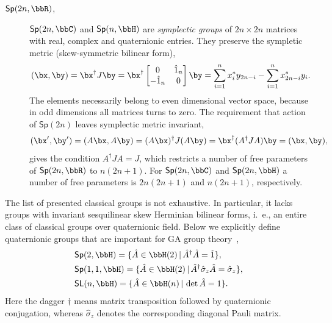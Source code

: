 \begin{unit}
\begin{description}
\item[$\mathsf{Sp}(2n,\bbR)$,] $\mathsf{Sp}(2n,\bbC)$ and
$\mathsf{Sp}(n,\bbH)$ are \textit{symplectic groups} of $2n\times
2n$ matrices with real, complex and quaternionic entries. They
preserve the  sympletic metric (skew-symmetric bilinear form),
\[
(\bx,\by)= \bx^{\dagger}J \by= \bx^{\dagger}
\begin{bmatrix}0&\hat{1}_n\\-\hat{1}_n&0\end{bmatrix}\by=\sum_{i=1}^n
x_i^* y_{2n-i} -\sum_{i=1}^{n} x_{2n-i}^* y_i.
\]
The elements necessarily belong to even dimensional vector space, because in odd dimensions all matrices turns to zero.
The requirement that action of $\mathsf{Sp}(2n)$ leaves symplectic
metric invariant,
\[(\bx^\prime,\by^\prime)=(A\bx,A\by)=(A\bx)^{\dagger}J(A\by)=
\bx^{\dagger}(A^{\dagger}J A)\by=(\bx,\by),\] gives the condition
$A^{\dagger}J A = J$, which restricts a number of free parameters
of $\mathsf{Sp}(2n,\bbR)$ to $n(2n+1)$. For $\mathsf{Sp}(2n,\bbC)$
and $\mathsf{Sp}(2n,\bbH)$ a number of  free parameters is
$2n(2n+1)$ and $n(2n+1)$, respectively.
\end{description}
The list of presented classical groups is not exhaustive. In
particular,  it lacks groups with invariant sesquilinear skew
Herminian bilinear forms, i.~e., an entire class of classical
groups over quaternionic field. Below we explicitly define
quaternionic groups that are important for GA group
theory~\cite{Trautman06},
\[\begin{split}
 &\mathsf{Sp}(2,\bbH)=\{\hat{A}\in\bbH(2)\,|\,\hat{A}^{\dagger}\hat{A}=\hat{1}\},\\
 &\mathsf{Sp}(1,1,\bbH)=\{\hat{A}\in\bbH(2)\,|\,\hat{A}^{\dagger}\hat{\sigma}_z\hat{A}=\hat{\sigma}_z\},\\
 &\mathsf{SL}(n,\bbH)=\{\hat{A}\in\bbH(n)\,|\,\det\hat{A}=1\}.
\end{split}\]
Here the dagger $\dagger$ means matrix transposition followed by
quaternionic conjugation, whereas $\hat{\sigma}_z$ denotes the
corresponding diagonal Pauli matrix.
\end{unit}
%
